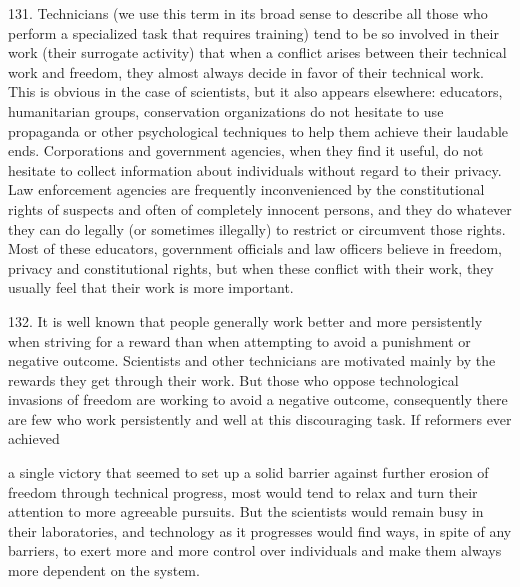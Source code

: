 \documentclass{article}
\begin{document}
131. Technicians (we use this term in its broad sense to describe all those who perform a 
specialized task that requires training) tend to be so involved in their work (their surrogate activity) 
that when a conflict arises between their technical work and freedom, they almost always decide 
in favor of their technical work. This is obvious in the case of scientists, but it also appears 
elsewhere: educators, humanitarian groups, conservation organizations do not hesitate to use 
propaganda or other psychological techniques to help them achieve their laudable 
ends. Corporations and government agencies, when they find it useful, do not hesitate to collect 
information about individuals without regard to their privacy. Law enforcement agencies are 
frequently inconvenienced by the constitutional rights of suspects and often of completely innocent 
persons, and they do whatever they can do legally (or sometimes illegally) to restrict or circumvent 
those rights. Most of these educators, government officials and law officers believe in freedom, 
privacy and constitutional rights, but when these conflict with their work, they usually feel that 
their work is more important. \vspace{\baselineskip}

132. It is well known that people generally work better and more persistently when striving for a 
reward than when attempting to avoid a punishment or negative outcome. Scientists and other 
technicians are motivated mainly by the rewards they get through their work. But those who 
oppose technological invasions of freedom are working to avoid a negative outcome, consequently 
there are few who work persistently and well at this discouraging task. If reformers ever achieved 
 
a single victory that seemed to set up a solid barrier against further erosion of freedom through 
technical progress, most would tend to relax and turn their attention to more agreeable 
pursuits. But the scientists would remain busy in their laboratories, and technology as it progresses 
would find ways, in spite of any barriers, to exert more and more control over individuals and 
make them always more dependent on the system. \vspace{\baselineskip}
\end{document}
